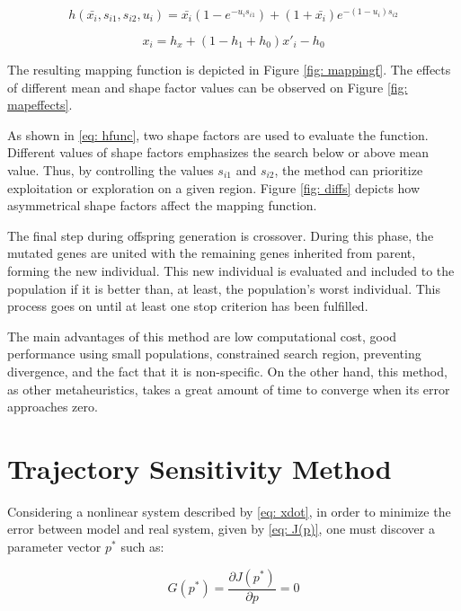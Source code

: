 \begin{equation}
	h(\bar{x_{i}}, s_{i1}, s_{i2}, u_{i}) = \bar{x_{i}}(1 - e^{-u_{i}s_{i1}}) + (1 + \bar{x_{i}})e^{-(1 - u_{i})s_{i2}}
	\label{eq: hfunc}
\end{equation}

\begin{equation}
	x_{i} = h_{x} + (1 - h_{1} + h_{0})x'_{i} - h_{0}
	\label{eq: mappingf}
\end{equation}

The resulting mapping function is depicted in Figure \ref{fig: mappingf}. The effects of different mean and shape factor values can be observed on Figure \ref{fig: mapeffects}.

As shown in \eqref{eq: hfunc}, two shape factors are used to evaluate the function. Different values of shape factors emphasizes the search below or above mean value. Thus, by controlling the values $s_{i1}$ and $s_{i2}$, the method can prioritize exploitation or exploration on a given region. Figure \ref{fig: diffs} depicts how asymmetrical shape factors affect the mapping function.

The final step during offspring generation is crossover. During this phase, the mutated genes are united with the remaining genes inherited from parent, forming the new individual. This new individual is evaluated and included to the population if it is better than, at least, the population's worst individual. This process goes on until at least one stop criterion has been fulfilled.

The main advantages of this method are low computational cost, good performance using small populations, constrained search region, preventing divergence, and the fact that it is non-specific. On the other hand, this method, as other metaheuristics, takes a great amount of time to converge when its error approaches zero.

\section{Trajectory Sensitivity Method}

Considering a nonlinear system described by \eqref{eq: xdot}, in order to minimize the error between model and real system, given by \eqref{eq: J(p)}, one must discover a parameter vector $p^{*}$ such as:

\begin{equation}
	G(p^{*}) = \frac{\partial J(p^{*})}{\partial p} = 0
\end{equation}

